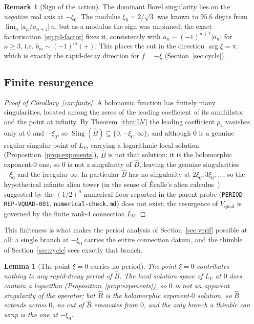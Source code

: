 \documentclass[11pt,reqno]{amsart}
\renewcommand{\_}{\vquadorigunderscore\allowbreak}
\theoremstyle{plain}
\newtheorem{lemma}[theorem]{Lemma}
\theoremstyle{definition}
\newtheorem{remark}[theorem]{Remark}
\newcommand{\Vquad}{V_{\mathrm{quad}}}
\newcommand{\Bhat}{\widehat{B}}
\newcommand{\LV}{L_{V}}
\newcommand{\xizero}{\xi_0}
\begin{document}
\begin{remark}[Sign of the action]
The dominant Borel singularity lies on the \emph{negative} real axis at $-\xizero$. The modulus
$\xizero=2/\sqrt3$ was known to $95.6$ digits from $\lim_n\lvert a_n/a_{n+1}\rvert\,n$, but as a
modulus the sign was unpinned; the exact factorisation~\eqref{eq:p4-factor} fixes it, consistently
with $a_n\sim(-1)^{n+1}\lvert a_n\rvert$ for $n\ge3$, i.e. $b_m\sim(-1)^m(+)$. This places the cut
in the direction $\arg\xi=\pi$, which is exactly the rapid-decay direction for $f=-\xi$
(Section~\ref{sec:cycle}).
\end{remark}

\subsection{Finite resurgence}
\begin{proof}[Proof of Corollary~\ref{cor:finite}]
A holonomic function has finitely many singularities, located among the zeros of the leading
coefficient of its annihilator and the point at infinity. By Theorem~\ref{thm:LV} the leading
coefficient $p_4$ vanishes only at $0$ and $-\xizero$, so
$\operatorname{Sing}(\Bhat)\subseteq\{0,-\xizero,\infty\}$; and although $0$ is a genuine regular
singular point of $\LV$, carrying a logarithmic local solution
(Proposition~\ref{prop:exponents}), $\Bhat$ is not that solution: it is the holomorphic
exponent-$0$ one, so $0$ is not a singularity of $\Bhat$, leaving the genuine singularities
$-\xizero$ and the
irregular $\infty$. In particular $\Bhat$ has no singularity at $2\xizero,3\xizero,\dots$, so the
hypothetical infinite alien tower (in the sense of \'Ecalle's alien calculus~\cite{Ecalle})
suggested by the $(1/2)^n$ numerical floor reported in the parent probe
(\texttt{PERIOD-REP-VQUAD-001}, \texttt{numerical-check.md})
does not exist; the resurgence of $\Vquad$ is governed by the finite rank-$4$ connection $\LV$.
\end{proof}

This finiteness is what makes the period analysis of Section~\ref{sec:verif} possible at all: a
single branch at $-\xizero$ carries the entire connection datum, and the thimble of
Section~\ref{sec:cycle} sees exactly that branch.

\begin{lemma}[The point $\xi=0$ carries no period]\label{lem:apparent}
The point $\xi=0$ contributes nothing to any rapid-decay period of $\Bhat$. The local solution
space of $\LV$ at $0$ does contain a logarithm (Proposition~\ref{prop:exponents}), so $0$ is not
an apparent singularity of the operator; but $\Bhat$ is the holomorphic exponent-$0$ solution, so
$\Bhat$ extends across $0$, no cut of $\Bhat$ emanates from $0$, and the only branch a thimble
can wrap is the one at $-\xizero$.
\end{lemma}
\end{document}
